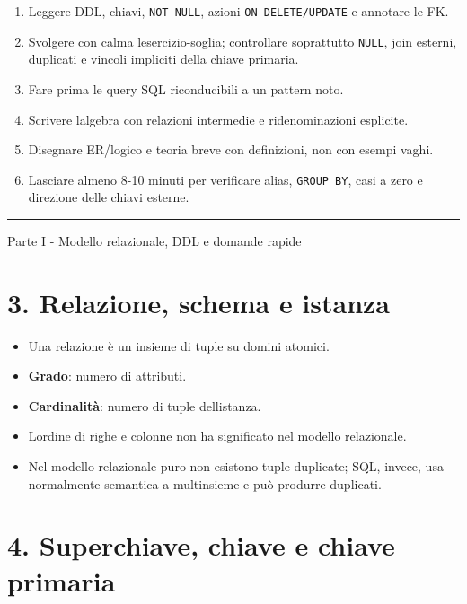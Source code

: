 \documentclass[
  10pt,
  a4paper,
]{article}
\providecommand{\tightlist}{%
  \setlength{\itemsep}{0pt}\setlength{\parskip}{0pt}}
\begin{document}
\begin{enumerate}
\def\labelenumi{\arabic{enumi}.}
\tightlist
\item
  Leggere DDL, chiavi, \texttt{NOT\ NULL}, azioni
  \texttt{ON\ DELETE/UPDATE} e annotare le FK.
\item
  Svolgere con calma l\textquotesingle esercizio-soglia; controllare
  soprattutto \texttt{NULL}, join esterni, duplicati e vincoli impliciti
  della chiave primaria.
\item
  Fare prima le query SQL riconducibili a un pattern noto.
\item
  Scrivere l\textquotesingle algebra con relazioni intermedie e
  ridenominazioni esplicite.
\item
  Disegnare ER/logico e teoria breve con definizioni, non con esempi
  vaghi.
\item
  Lasciare almeno 8-10 minuti per verificare alias, \texttt{GROUP\ BY},
  casi a zero e direzione delle chiavi esterne.
\end{enumerate}

\begin{center}\rule{0.5\linewidth}{0.5pt}\end{center}

Parte I - Modello relazionale, DDL e domande rapide

\section{3. Relazione, schema e
istanza}\label{3-relazione-schema-e-istanza}

\begin{itemize}
\tightlist
\item
  Una relazione è un insieme di tuple su domini atomici.
\item
  \textbf{Grado}: numero di attributi.
\item
  \textbf{Cardinalità}: numero di tuple dell\textquotesingle istanza.
\item
  L\textquotesingle ordine di righe e colonne non ha significato nel
  modello relazionale.
\item
  Nel modello relazionale puro non esistono tuple duplicate; SQL,
  invece, usa normalmente semantica a multinsieme e può produrre
  duplicati.
\end{itemize}

\section{4. Superchiave, chiave e chiave
primaria}\label{4-superchiave-chiave-e-chiave-primaria}
\end{document}
